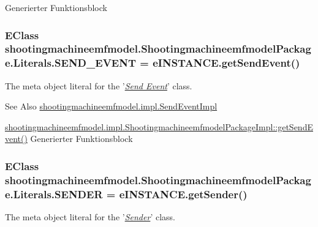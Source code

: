 Generierter Funktionsblock \hypertarget{interfaceshootingmachineemfmodel_1_1_shootingmachineemfmodel_package_1_1_literals_a317aabab1ec23d18b8de6dd458f47caa}{
\subsubsection[{S\-E\-N\-D\-\_\-\-E\-V\-E\-N\-T}]{\setlength{\rightskip}{0pt plus 5cm}E\-Class shootingmachineemfmodel.\-Shootingmachineemfmodel\-Package.\-Literals.\-S\-E\-N\-D\-\_\-\-E\-V\-E\-N\-T = e\-I\-N\-S\-T\-A\-N\-C\-E.\-get\-Send\-Event()}}\label{interfaceshootingmachineemfmodel_1_1_shootingmachineemfmodel_package_1_1_literals_a317aabab1ec23d18b8de6dd458f47caa}
The meta object literal for the '\hyperlink{classshootingmachineemfmodel_1_1impl_1_1_send_event_impl}{{\itshape Send Event}}' class.

\begin{DoxySeeAlso}{See Also}
\hyperlink{classshootingmachineemfmodel_1_1impl_1_1_send_event_impl}{shootingmachineemfmodel.\-impl.\-Send\-Event\-Impl} 

\hyperlink{classshootingmachineemfmodel_1_1impl_1_1_shootingmachineemfmodel_package_impl_aa809696addcdd5ce6873eae0d5f4c1e6}{shootingmachineemfmodel.\-impl.\-Shootingmachineemfmodel\-Package\-Impl\-::get\-Send\-Event()} Generierter Funktionsblock 
\end{DoxySeeAlso}
\hypertarget{interfaceshootingmachineemfmodel_1_1_shootingmachineemfmodel_package_1_1_literals_aa357d1c04e9e4b8441204c409714c446}{
\subsubsection[{S\-E\-N\-D\-E\-R}]{\setlength{\rightskip}{0pt plus 5cm}E\-Class shootingmachineemfmodel.\-Shootingmachineemfmodel\-Package.\-Literals.\-S\-E\-N\-D\-E\-R = e\-I\-N\-S\-T\-A\-N\-C\-E.\-get\-Sender()}}\label{interfaceshootingmachineemfmodel_1_1_shootingmachineemfmodel_package_1_1_literals_aa357d1c04e9e4b8441204c409714c446}
The meta object literal for the '\hyperlink{classshootingmachineemfmodel_1_1impl_1_1_sender_impl}{{\itshape Sender}}' class.

